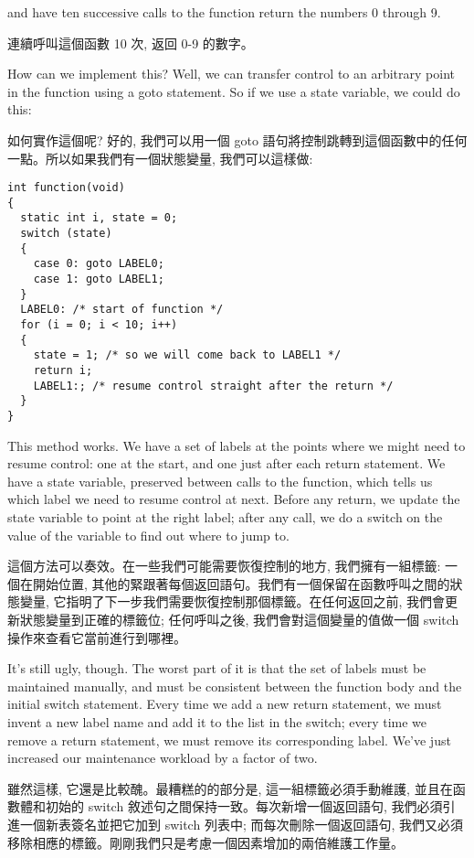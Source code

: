 \documentclass[12pt]{article}
\begin{document}
\begin{CJK}{UTF8}{bsmi}
and have ten successive calls to the function return the numbers 0 through 9.

連續呼叫這個函數 10 次, 返回 0-9 的數字。 

How can we implement this? Well, we can transfer control to an arbitrary point in the function using a goto statement. So if we use a state variable, we could do this:

如何實作這個呢? 好的, 我們可以用一個 goto 語句將控制跳轉到這個函數中的任何一點。所以如果我們有一個狀態變量, 我們可以這樣做:

\begin{lstlisting}[basicstyle=\footnotesize, breaklines=true]
int function(void) 
{
  static int i, state = 0;
  switch (state) 
  {
    case 0: goto LABEL0;
    case 1: goto LABEL1;
  }
  LABEL0: /* start of function */
  for (i = 0; i < 10; i++) 
  {
    state = 1; /* so we will come back to LABEL1 */
    return i;
    LABEL1:; /* resume control straight after the return */
  }
}
\end{lstlisting}

This method works. We have a set of labels at the points where we might need to resume control: one at the start, and one just after each return statement. We have a state variable, preserved between calls to the function, which tells us which label we need to resume control at next. Before any return, we update the state variable to point at the right label; after any call, we do a switch on the value of the variable to find out where to jump to.

這個方法可以奏效。在一些我們可能需要恢復控制的地方, 我們擁有一組標籤: 一個在開始位置, 其他的緊跟著每個返回語句。我們有一個保留在函數呼叫之間的狀態變量, 它指明了下一步我們需要恢復控制那個標籤。在任何返回之前, 我們會更新狀態變量到正確的標籤位;
任何呼叫之後, 我們會對這個變量的值做一個 switch 操作來查看它當前進行到哪裡。

It's still ugly, though. The worst part of it is that the set of labels must be maintained manually, and must be consistent between the function body and the initial switch statement. Every time we add a new return statement, we must invent a new label name and add it to the list in the switch; every time we remove a return statement, we must remove its corresponding label. We've just increased our maintenance workload by a factor of two.


雖然這樣, 它還是比較醜。最糟糕的的部分是, 這一組標籤必須手動維護, 並且在函數體和初始的 switch 敘述句之間保持一致。每次新增一個返回語句, 我們必須引進一個新表簽名並把它加到 switch 列表中;
而每次刪除一個返回語句, 我們又必須移除相應的標籤。剛剛我們只是考慮一個因素增加的兩倍維護工作量。


\end{CJK}
\end{document}
